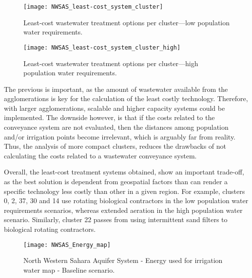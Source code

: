 \begin{figure*}[!ht]
	\centering
	\texttt{[image: NWSAS\_least-cost\_system\_cluster]}
	\caption{Least-cost wastewater treatment options per cluster---low population water requirements.}
	\label{fig:leastLow}
\end{figure*}

\begin{figure*}[!ht]
	\centering
	\texttt{[image: NWSAS\_least-cost\_system\_cluster\_high]}
	\caption{Least-cost wastewater treatment options per cluster---high population water requirements.}
	\label{fig:leastHigh}
\end{figure*}

The previous is important, as the amount of wastewater available from the agglomerations is key for the calculation of the least costly technology. Therefore, with larger agglomerations, scalable and higher capacity systems could be implemented. The downside however, is that if the costs related to the conveyance system are not evaluated, then the distances among population and/or irrigation points become irrelevant, which is arguably far from reality. Thus, the analysis of more compact clusters, reduces the drawbacks of not calculating the costs related to a wastewater conveyance system.

Overall, the least-cost treatment systems obtained, show an important trade-off, as the best solution is dependent from geospatial factors than can render a specific technology less costly than other in a given region. For example, clusters 0, 2, 37, 30 and 14 use rotating biological contractors in the low population water requirements scenarios, whereas extended aeration in the high population water scenario. Similarly, cluster 22 passes from using intermittent sand filters to biological rotating contractors.

\begin{figure*}[!b]
	\centering
	\texttt{[image: NWSAS\_Energy\_map]}
	\caption[NWSAS energy used for irrigation water map - Baseline scenario]{North Western Sahara Aquifer System - Energy used for irrigation water map - Baseline scenario.}
	\label{fig:energy_map}
\end{figure*}

